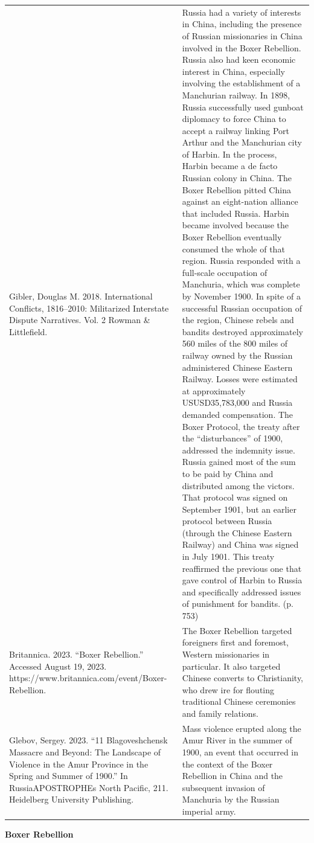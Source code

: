 {\begin{longtable}{p{}p{}}
Gibler, Douglas M. 2018. International Conflicts, 1816–2010: Militarized Interstate Dispute Narratives. Vol. 2 Rowman \& Littlefield. & Russia had a variety of interests in China, including the presence of Russian missionaries in China involved in the Boxer Rebellion. Russia also had keen economic interest in China, especially involving the establishment of a Manchurian railway. In 1898, Russia successfully used gunboat diplomacy to force China to accept a railway linking Port Arthur and the Manchurian city of Harbin. In the process, Harbin became a de facto Russian colony in China. The Boxer Rebellion pitted China against an eight-nation alliance that included Russia. Harbin became involved because the Boxer Rebellion eventually consumed the whole of that region. Russia responded with a full-scale occupation of Manchuria, which was complete by November 1900. In spite of a successful Russian occupation of the region, Chinese rebels and bandits destroyed approximately 560 miles of the 800 miles of railway owned by the Russian administered Chinese Eastern Railway. Losses were estimated at approximately USUSD35,783,000 and Russia demanded compensation. The Boxer Protocol, the treaty after the “disturbances” of 1900, addressed the indemnity issue. Russia gained most of the sum to be paid by China and distributed among the victors. That protocol was signed on September 1901, but an earlier protocol between Russia (through the Chinese Eastern Railway) and China was signed in July 1901. This treaty reaffirmed the previous one that gave control of Harbin to Russia and specifically addressed issues of punishment for bandits. (p. 753)
\\
Britannica. 2023. “Boxer Rebellion.” Accessed August 19, 2023. https://www.britannica.com/event/Boxer-Rebellion. & The Boxer Rebellion targeted foreigners first and foremost, Western missionaries in particular. It also targeted Chinese converts to Christianity, who drew ire for flouting traditional Chinese ceremonies and family relations.
\\
Glebov, Sergey. 2023. “11 Blagoveshchensk Massacre and Beyond: The Landscape of Violence in the Amur Province in the Spring and Summer of 1900.” In RussiaAPOSTROPHEs North Pacific, 211. Heidelberg University Publishing. & Mass violence erupted along the Amur River in the summer of 1900, an
event that occurred in the context of the Boxer Rebellion in China and
the subsequent invasion of Manchuria by the Russian imperial army.
\\
\end{longtable}}
\clearpage
         \textbf{Boxer Rebellion} 


